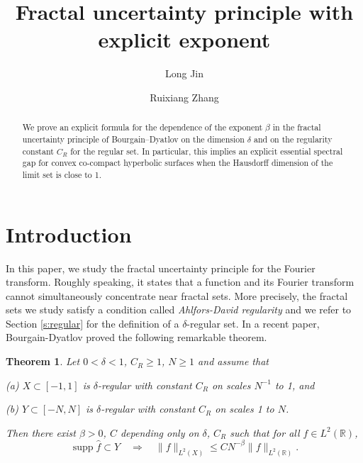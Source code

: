 \documentclass[reqno,12pt,letterpaper]{amsart}
\newtheorem{thm}[prop]{Theorem}
\numberwithin{equation}{section}
\numberwithin{prop}{section}
\DeclareMathOperator{\supp}{supp}
\begin{document}
\title{Fractal uncertainty principle with explicit exponent}

\author{Long Jin}
\address{Yau Mathematical Sciences Center, Tsinghua University, Beijing, China}
\author{Ruixiang Zhang}
\address{Institute for Advanced Study, 1 Einstein Drive, Simonyi Hall 105, Princeton, NJ 08540}

\begin{abstract}
We prove an explicit formula for the dependence of the exponent $\beta$ in the fractal uncertainty principle of Bourgain--Dyatlov \cite{fullgap} on the dimension $\delta$ and on the regularity constant $C_R$ for the regular set. In particular, this implies an explicit essential spectral gap for convex co-compact hyperbolic surfaces when the Hausdorff dimension of the limit set is close to 1.
\end{abstract}

\maketitle


\section{Introduction}
\label{s:intro}
In this paper, we study the fractal uncertainty principle for the Fourier transform. Roughly speaking, it states that a function and its Fourier transform cannot simultaneously concentrate near fractal sets. More precisely, the fractal sets we study satisfy a condition called \emph{Ahlfors-David regularity} and we refer to Section \ref{s:regular} for the definition of a $\delta$-regular set. In a recent paper, Bourgain-Dyatlov \cite{fullgap} proved the following remarkable theorem.


\begin{thm}
\label{t:bdfup}
Let $0<\delta<1$, $C_R\geq1$, $N\geq1$ and assume that 

(a) $X\subset[-1,1]$ is $\delta$-regular with constant $C_R$ on scales $N^{-1}$ to 1, and 

(b) $Y\subset[-N,N]$ is $\delta$-regular with constant $C_R$ on scales 1 to $N$. 

Then there exist $\beta>0$, $C$ depending only on $\delta$, $C_R$ such that for all $f\in L^2(\mathbb{R})$,
\begin{equation}
\supp\widehat{f}\subset Y\quad\Rightarrow\quad \|f\|_{L^2(X)}\leq CN^{-\beta}\|f\|_{L^2(\mathbb{R})}.
\end{equation}
\end{thm}
\end{document}
